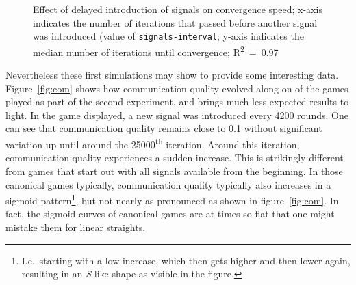 \documentclass[
	DIV=calc,
	BCOR=0mm,
	pagesize,
	titlepage
]{scrartcl}
\newcommand{\code}[1]{\texttt{#1}}
\begin{document}
\begin{figure}
	\centering
	\caption{Effect of delayed introduction of signals on convergence speed; x-axis indicates the number of iterations that passed before another signal was introduced (value of \code{signals-interval}; y-axis indicates the median number of iterations until convergence; R\textsuperscript{2}~=~0.97}
	\label{fig:sigmacro}
\end{figure}

Nevertheless these first simulations may show to provide some interesting data.
Figure~\ref{fig:com} shows how communication quality evolved along on of the games played as part of the second experiment, and brings much less expected results to light.
In the game displayed, a new signal was introduced every 4200 rounds.
One can see that communication quality remains close to 0.1 without significant variation up until around the 25000\textsuperscript{th} iteration.
Around this iteration, communication quality experiences a sudden increase.
This is strikingly different from games that start out with all signals available from the beginning.
In those canonical games typically, communication quality typically also increases in a sigmoid pattern\footnote{I.e.\ starting with a low increase, which then gets higher and then lower again, resulting in an \textit{S}-like shape as visible in the figure.}, but not nearly as pronounced as shown in figure~\ref{fig:com}.
In fact, the sigmoid curves of canonical games are at times so flat that one might mistake them for linear straights.
\end{document}
